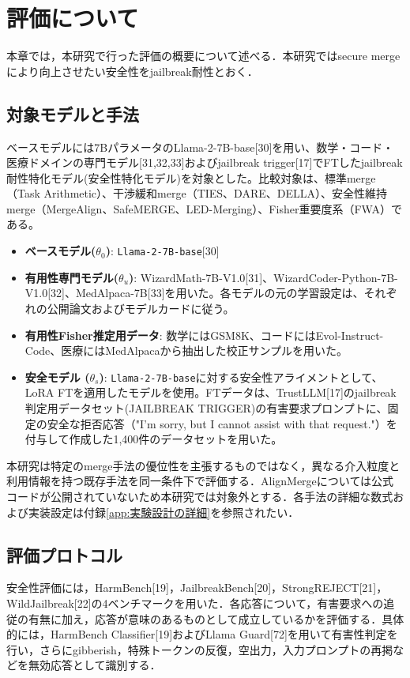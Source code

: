 \documentclass{article}
\begin{document}
\section{評価について}
本章では，本研究で行った評価の概要について述べる．本研究ではsecure mergeにより向上させたい安全性をjailbreak耐性とおく．
\subsection{対象モデルと手法}

ベースモデルには7BパラメータのLlama-2-7B-base[30]を用い、数学・コード・医療ドメインの専門モデル[31,32,33]およびjailbreak trigger[17]でFTしたjailbreak耐性特化モデル(安全性特化モデル)を対象とした。比較対象は、標準merge（Task Arithmetic）、干渉緩和merge（TIES、DARE、DELLA）、安全性維持merge（MergeAlign、SafeMERGE、LED-Merging）、Fisher重要度系（FWA）である。

\begin{itemize}
\item \textbf{ベースモデル($\theta_0$)}: \texttt{Llama-2-7B-base}[30]
\item \textbf{有用性専門モデル($\theta_u$)}: WizardMath-7B-V1.0[31]、WizardCoder-Python-7B-V1.0[32]、MedAlpaca-7B[33]を用いた。各モデルの元の学習設定は、それぞれの公開論文およびモデルカードに従う。
\item \textbf{有用性Fisher推定用データ}: 数学にはGSM8K、コードにはEvol-Instruct-Code、医療にはMedAlpacaから抽出した校正サンプルを用いた。
\item \textbf{安全モデル ($\theta_s$)}: \texttt{Llama-2-7B-base}に対する安全性アライメントとして、LoRA FTを適用したモデルを使用。FTデータは、TrustLLM[17]のjailbreak判定用データセット(JAILBREAK TRIGGER)の有害要求プロンプトに、固定の安全な拒否応答（"I'm sorry, but I cannot assist with that request."）を付与して作成した1,400件のデータセットを用いた。
\end{itemize}

本研究は特定のmerge手法の優位性を主張するものではなく，異なる介入粒度と利用情報を持つ既存手法を同一条件下で評価する．AlignMergeについては公式コードが公開されていないため本研究では対象外とする．各手法の詳細な数式および実装設定は付録\ref{app:実験設計の詳細}を参照されたい．

\subsection{評価プロトコル}
安全性評価には，HarmBench[19]，JailbreakBench[20]，StrongREJECT[21]，WildJailbreak[22]の4ベンチマークを用いた．各応答について，有害要求への追従の有無に加え，応答が意味のあるものとして成立しているかを評価する．具体的には，HarmBench Classifier[19]およびLlama Guard[72]を用いて有害性判定を行い，さらにgibberish，特殊トークンの反復，空出力，入力プロンプトの再掲などを無効応答として識別する．
\end{document}
